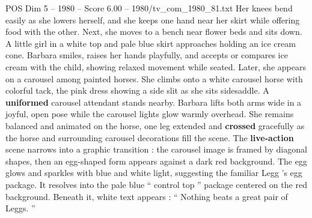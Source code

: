 \begin{textsample}{POS Dim 5 – 1980 – Score 6.00 – 1980/tv\_com\_1980\_81.txt}
Her knees bend easily as she lowers herself, and she keeps one hand near her skirt while offering food with the other.
Next, she moves to a bench near flower beds and sits down.
A little girl in a white top and pale blue skirt approaches holding an ice cream cone.
Barbara smiles, raises her hands playfully, and accepts or compares ice cream with the child, showing relaxed movement while seated.
Later, she appears on a carousel among painted horses.
She climbs onto a white carousel horse with colorful tack, the pink dress showing a side slit as she sits sidesaddle.
A \textbf{uniformed} carousel attendant stands nearby.
Barbara lifts both arms wide in a joyful, open pose while the carousel lights glow warmly overhead.
She remains balanced and animated on the horse, one leg extended and \textbf{crossed} gracefully as the horse and surrounding carousel decorations fill the scene.
The \textbf{live-action} scene narrows into a graphic transition : the carousel image is framed by diagonal shapes, then an egg-shaped form appears against a dark red background.
The egg glows and sparkles with blue and white light, suggesting the familiar Legg ’s egg package.
It resolves into the pale blue “ control top ” package centered on the red background.
Beneath it, white text appears : “ Nothing beats a great pair of Leggs. ”

\end{textsample}
